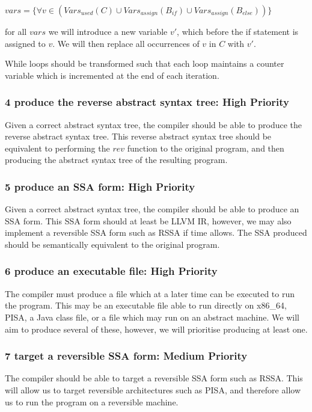 \begin{center}
$vars = \{\forall v \in (Vars_{used}(C) \cup Vars_{assign}(B_{if}) \cup Vars_{assign}(B_{else}))\}$
\end{center}

for all $vars$ we will introduce a new variable $v'$, which before the if statement is assigned to $v$.
We will then replace all occurrences of $v$ in $C$ with $v'$.

While loops should be transformed such that each loop maintains a counter variable which is incremented at the end of each iteration.

\subsubsection[4]{4 produce the reverse abstract syntax tree: High Priority}
Given a correct abstract syntax tree, the compiler should be able to produce the reverse abstract syntax tree.
This reverse abstract syntax tree should be equivalent to performing the $rev$ function to the original program, and then producing the abstract syntax tree of the resulting program.

\subsubsection[5]{5 produce an SSA form: High Priority}
Given a correct abstract syntax tree, the compiler should be able to produce an SSA form.
This SSA form should at least be LLVM IR, however, we may also implement a reversible SSA form such as RSSA if time allows.
The SSA produced should be semantically equivalent to the original program.

\subsubsection[6]{6 produce an executable file: High Priority}
The compiler must produce a file which at a later time can be executed to run the program.
This may be an executable file able to run directly on x86\_64, PISA, a Java class file, or a file which may run on an abstract machine.
We will aim to produce several of these, however, we will prioritise producing at least one.

\subsubsection[7]{7 target a reversible SSA form: Medium Priority}
The compiler should be able to target a reversible SSA form such as RSSA.
This will allow us to target reversible architectures such as PISA, and therefore allow us to run the program on a reversible machine.

